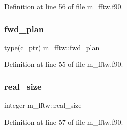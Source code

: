 Definition at line 56 of file m\+\_\+fftw.\+f90.

\mbox{\label{namespacem__fftw_af605e2137e55bfc3b5e95bbdad51803a}} 
\subsubsection{\texorpdfstring{fwd\+\_\+plan}{fwd\_plan}}
{\footnotesize\ttfamily type(c\+\_\+ptr) m\+\_\+fftw\+::fwd\+\_\+plan}



Definition at line 55 of file m\+\_\+fftw.\+f90.

\mbox{\label{namespacem__fftw_a7963f79188a7191b7d8436707e2aa4a5}} 
\subsubsection{\texorpdfstring{real\+\_\+size}{real\_size}}
{\footnotesize\ttfamily integer m\+\_\+fftw\+::real\+\_\+size}



Definition at line 57 of file m\+\_\+fftw.\+f90.

